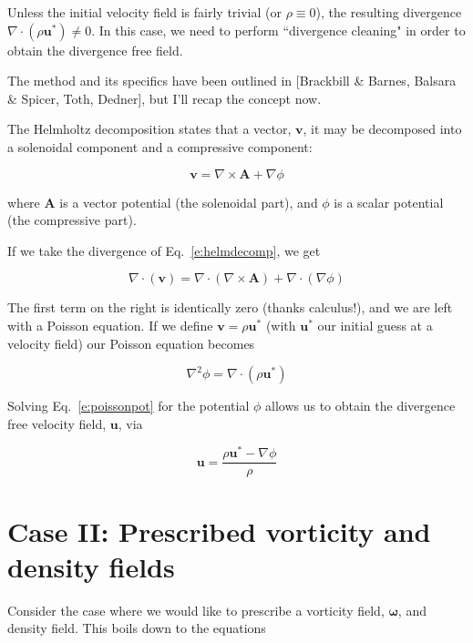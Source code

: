 \documentclass[a4paper,10pt]{article}
\newcommand{\vect}[1]{\bm{#1}}
\newcommand{\diverg}[1]{\nabla\cdot\left(#1\right)}
\begin{document}
Unless the initial velocity field is fairly trivial (or $\rho\equiv0$), the resulting divergence $\diverg{\rho\vect{u^*}}\neq0$. In this case, we need to perform ``divergence cleaning" in order to obtain the divergence free field. 

The method and its specifics have been outlined in [Brackbill \& Barnes, Balsara \& Spicer, Toth, Dedner], but I'll recap the concept now.

The Helmholtz decomposition states that a vector, $\vect{v}$, it may be decomposed into a solenoidal component and a compressive component:

\begin{equation} \label{e:helmdecomp}
\vect{v} = \nabla\times\vect{A} + \nabla\phi
\end{equation}

where $\vect{A}$ is a vector potential (the solenoidal part), and $\phi$ is a scalar potential (the compressive part). 

If we take the divergence of Eq.~\ref{e:helmdecomp}, we get

\begin{equation}
\diverg{\vect{v}} = \diverg{\nabla\times\vect{A}} + \diverg{\nabla\phi}
\end{equation}

The first term on the right is identically zero (thanks calculus!), and we are left with a Poisson equation. If we define $\vect{v}=\rho\vect{u^*}$ (with $\vect{u^*}$ our initial guess at a velocity field) our Poisson equation becomes

\begin{equation}
\label{e:poissonpot}
\nabla^2\phi = \diverg{\rho\vect{u^*}}
\end{equation}

Solving Eq.~\ref{e:poissonpot} for the potential $\phi$ allows us to obtain the divergence free velocity field, $\vect{u}$, via 

\begin{equation}
\vect{u} = \frac{\rho\vect{u^*} - \nabla\phi}{\rho}
\end{equation}


\section{Case II: Prescribed vorticity and density fields}

Consider the case where we would like to prescribe a vorticity field, $\vect{\omega}$, and density field. This boils down to the equations
\end{document}
